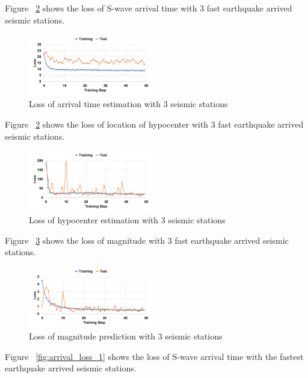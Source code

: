 
Figure ~\ref{fig:center_loss_3} shows the loss of S-wave arrival time with 3 fast earthquake arrived seismic stations.

\begin{figure}[t]
\includegraphics[width=0.48\textwidth]{figs/arrival_loss_3.pdf}
\caption{Loss of arrival time estimation with 3 seismic stations}
\label{fig:arrival_loss_3}
\end{figure}

Figure ~\ref{fig:center_loss_3} shows the loss of location of hypocenter with 3 fast earthquake arrived seismic stations.

\begin{figure}[t]
\includegraphics[width=0.48\textwidth]{figs/center_loss_3.pdf}
\caption{Loss of hypocenter estimation with 3 seismic stations}
\label{fig:center_loss_3}
\end{figure}

Figure ~\ref{fig:mag_loss_3} shows the loss of magnitude with 3 fast earthquake arrived seismic stations.

\begin{figure}[t]
\includegraphics[width=0.48\textwidth]{figs/mag_loss_3.pdf}
\caption{Loss of magnitude prediction with 3 seismic stations}
\label{fig:mag_loss_3}
\end{figure}


Figure ~\ref{fig:arrival_loss_1} shows the loss of S-wave arrival time with the fastest earthquake arrived seismic stations.

